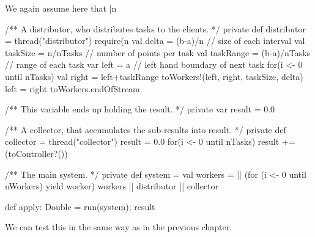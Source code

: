 
\begin{slide}

We again assume here that |n%
\begin{scala}
  /** A distributor, who distributes tasks to the clients. */
  private def distributor = thread("distributor"){
    require(n%
    val delta = (b-a)/n               // size of each interval
    val taskSize = n/nTasks          // number of points per task
    val taskRange = (b-a)/nTasks // range of each task
    var left = a                      // left hand boundary of next task
    for(i <- 0 until nTasks){
      val right = left+taskRange
      toWorkers!(left, right, taskSize, delta)
      left = right
    }
    toWorkers.endOfStream
  }
\end{scala}
\end{slide}


\begin{slide}

\begin{scala}
  /** This variable ends up holding the result. */
  private var result = 0.0

  /** A collector, that accumulates the sub-results into result. */
  private def collector = thread("collector"){
    result = 0.0
    for(i <- 0 until nTasks) result += (toController?())
  }
\end{scala}
\end{slide}


\begin{slide}

\begin{scala}
  /** The main system. */
  private def system = {
    val workers = || (for (i <- 0 until nWorkers) yield worker)
    workers || distributor || collector
  }

  def apply: Double = { run(system); result } 
\end{scala}
%


We can test this in the same way as in the previous chapter.
\end{slide}
